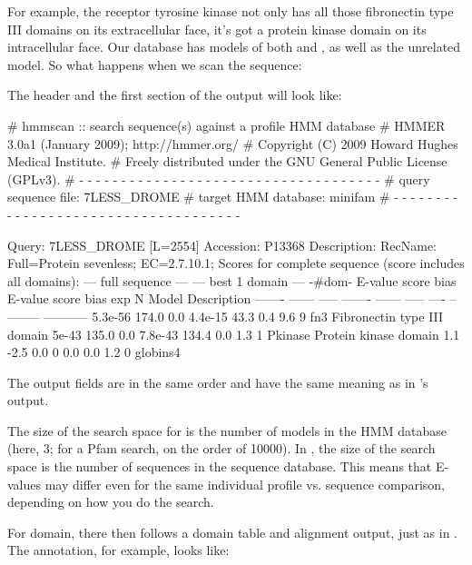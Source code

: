 For example, the receptor tyrosine kinase  not only
has all those fibronectin type III domains on its extracellular face,
it's got a protein kinase domain on its intracellular face. Our
 database has models of both  and
, as well as the unrelated  model. So
what happens when we scan the  sequence:


The header and the first section of the output will look like:

\begin{sreoutput}
# hmmscan :: search sequence(s) against a profile HMM database
# HMMER 3.0a1 (January 2009); http://hmmer.org/
# Copyright (C) 2009 Howard Hughes Medical Institute.
# Freely distributed under the GNU General Public License (GPLv3).
# - - - - - - - - - - - - - - - - - - - - - - - - - - - - - - - - - - - -
# query sequence file:             7LESS_DROME
# target HMM database:             minifam
# - - - - - - - - - - - - - - - - - - - - - - - - - - - - - - - - - - - -

Query:       7LESS_DROME  [L=2554]
Accession:   P13368
Description: RecName: Full=Protein sevenless;          EC=2.7.10.1;
Scores for complete sequence (score includes all domains):
 --- full sequence ---   --- best 1 domain ---    -#dom-
  E-value  score  bias    E-value  score  bias    exp  N  Model    Description
  ------- ------ -----    ------- ------ -----   ---- --  -------- -----------
  5.3e-56  174.0   0.0    4.4e-15   43.3   0.4    9.6  9  fn3      Fibronectin type III domain
    5e-43  135.0   0.0    7.8e-43  134.4   0.0    1.3  1  Pkinase  Protein kinase domain
      1.1   -2.5   0.0          0    0.0   0.0    1.2  0  globins4
\end{sreoutput}

The output fields are in the same order and have the same meaning as
in 's output. 

The size of the search space for  is the number of
models in the HMM database (here, 3; for a Pfam search, on the order
of 10000). In , the size of the search space is the
number of sequences in the sequence database. This means that E-values
may differ even for the same individual profile vs. sequence
comparison, depending on how you do the search.

For domain, there then follows a domain table and alignment output,
just as in . The  annotation, for example,
looks like:

